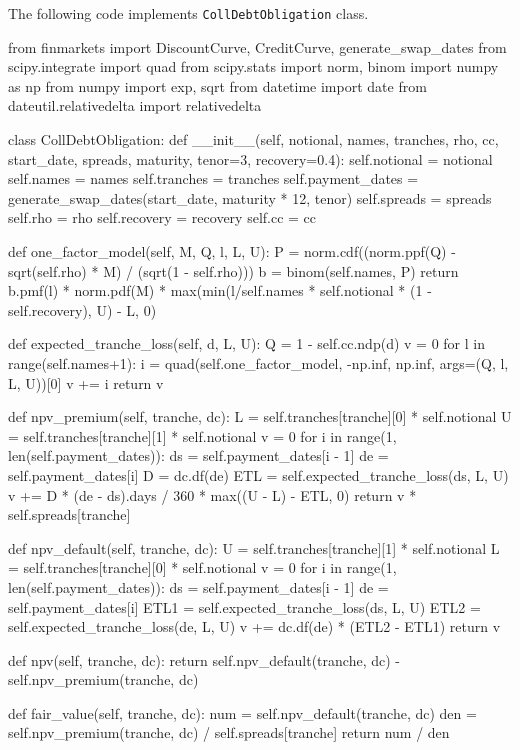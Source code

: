 The following code implements \texttt{CollDebtObligation} class.

\begin{ipython}
from finmarkets import DiscountCurve, CreditCurve, generate_swap_dates
from scipy.integrate import quad
from scipy.stats import norm, binom
import numpy as np
from numpy import exp, sqrt
from datetime import date
from dateutil.relativedelta import relativedelta

class CollDebtObligation:
    def __init__(self, notional, names, tranches, rho, cc,
                 start_date, spreads, maturity, tenor=3, recovery=0.4):
        self.notional = notional
        self.names = names
        self.tranches = tranches
        self.payment_dates = generate_swap_dates(start_date, maturity * 12, tenor)
        self.spreads = spreads
        self.rho = rho
        self.recovery = recovery
        self.cc = cc

    def one_factor_model(self, M, Q, l, L, U):
        P = norm.cdf((norm.ppf(Q) - sqrt(self.rho) * M) / (sqrt(1 - self.rho)))
        b = binom(self.names, P)
        return b.pmf(l) * norm.pdf(M) * max(min(l/self.names *
            self.notional * (1 - self.recovery), U) - L, 0)

    def expected_tranche_loss(self, d, L, U):
        Q = 1 - self.cc.ndp(d)
        v = 0 
        for l in range(self.names+1):
            i = quad(self.one_factor_model, -np.inf, np.inf,
                args=(Q, l, L, U))[0]
            v += i
        return v

    def npv_premium(self, tranche, dc):
        L = self.tranches[tranche][0] * self.notional
        U = self.tranches[tranche][1] * self.notional
        v = 0
        for i in range(1, len(self.payment_dates)):
            ds = self.payment_dates[i - 1]
            de = self.payment_dates[i]
            D = dc.df(de)
            ETL = self.expected_tranche_loss(ds, L, U)
            v += D * (de - ds).days / 360 * max((U - L) - ETL, 0)
        return v * self.spreads[tranche]

    def npv_default(self, tranche, dc):
        U = self.tranches[tranche][1] * self.notional
        L = self.tranches[tranche][0] * self.notional
        v = 0
        for i in range(1, len(self.payment_dates)):
            ds = self.payment_dates[i - 1]
            de = self.payment_dates[i]
            ETL1 = self.expected_tranche_loss(ds, L, U)
            ETL2 = self.expected_tranche_loss(de, L, U)
            v += dc.df(de) * (ETL2 - ETL1)
        return v

    def npv(self, tranche, dc):
        return self.npv_default(tranche, dc) - self.npv_premium(tranche, dc)

    def fair_value(self, tranche, dc):
        num = self.npv_default(tranche, dc)
        den = self.npv_premium(tranche, dc) / self.spreads[tranche]
        return num / den
\end{ipython}

